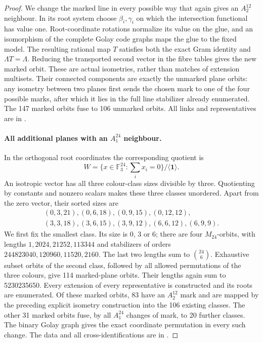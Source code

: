 \begin{proof}
We change the marked line in every possible way that again gives
an \(A_2^{12}\) neighbour. In its root system choose
\(\beta_i,\gamma_i\) on which the intersection functional has
value one. Root-coordinate rotations normalize its value on the
glue, and an isomorphism of the complete Golay code graphs maps
the glue to the fixed model. The resulting rational map \(T\)
satisfies both the exact Gram identity and
\(\Lambda T=\Lambda\). Reducing the transported second vector in
the fibre tables gives the new marked orbit. These are actual
isometries, rather than matches of extension multisets. Their
connected components are exactly the unmarked plane orbits:
any isometry between two planes first sends the chosen mark to one
of the four possible marks, after which it lies in the full line
stabilizer already enumerated. The 147 marked orbits fuse to 106
unmarked orbits. All links and representatives are in
.

\paragraph{All additional planes with an \(A_1^{24}\) neighbour.}
In the orthogonal root coordinates the corresponding quotient is
\[
 W=\{x\in\mathbb F_3^{24}:\sum_i x_i=0\}/\langle\mathbf1\rangle.
\]
An isotropic vector has all three colour-class sizes divisible by
three. Quotienting by constants and nonzero scalars makes these
three classes unordered. Apart from the zero vector, their sorted
sizes are
\[
\begin{gathered}
(0,3,21),(0,6,18),(0,9,15),(0,12,12),\\
(3,3,18),(3,6,15),(3,9,12),(6,6,12),(6,9,9).
\end{gathered}
\]
We first fix the smallest class. Its size is 0, 3 or 6; there are
four \(M_{24}\)-orbits, with lengths
\(1,2024,21252,113344\) and stabilizers of orders
\(244823040,120960,11520,2160\). The last two lengths sum to
\(\binom{24}{6}\). Exhaustive subset orbits of the second class,
followed by all allowed permutations of the three colours, give
114 marked-plane orbits. Their lengths again sum to 5230235650.
Every extension of every representative is constructed and its
roots are enumerated. Of these marked orbits, 83 have an
\(A_2^{12}\) mark and are mapped by the preceding explicit
isometry construction into the 106 existing classes. The other
31 marked orbits fuse, by all \(A_1^{24}\) changes of mark, to
20 further classes. The binary Golay graph gives the exact
coordinate permutation in every such change. The data and all
cross-identifications are in .


\end{proof}
